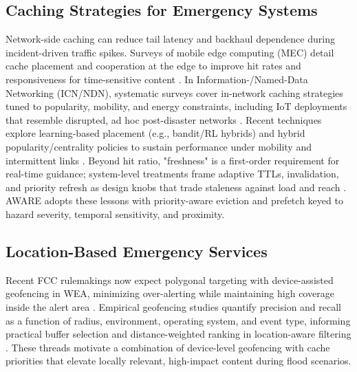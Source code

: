 \subsection{Caching Strategies for Emergency Systems}
Network-side caching can reduce tail latency and backhaul dependence during incident-driven traffic spikes. Surveys of mobile edge computing (MEC) detail cache placement and cooperation at the edge to improve hit rates and responsiveness for time-sensitive content \cite{mec-caching-survey-2023}. In Information-/Named-Data Networking (ICN/NDN), systematic surveys cover in-network caching strategies tuned to popularity, mobility, and energy constraints, including IoT deployments that resemble disrupted, ad hoc post-disaster networks \cite{icn-iot-caching-survey-2023}. Recent techniques explore learning-based placement (e.g., bandit/RL hybrids) and hybrid popularity/centrality policies to sustain performance under mobility and intermittent links \cite{cache-mab-2023,electronics-2024-koide-icanet}. Beyond hit ratio, "freshness" is a first-order requirement for real-time guidance; system-level treatments frame adaptive TTLs, invalidation, and priority refresh as design knobs that trade staleness against load and reach \cite{hotnets-2024-freshness}. AWARE adopts these lessons with priority-aware eviction and prefetch keyed to hazard severity, temporal sensitivity, and proximity.

\subsection{Location-Based Emergency Services}
Recent FCC rulemakings now expect polygonal targeting with device-assisted geofencing in WEA, minimizing over-alerting while maintaining high coverage inside the alert area \cite{fcc-2018-geo,fcc-wea-2023-doc}. Empirical geofencing studies quantify precision and recall as a function of radius, environment, operating system, and event type, informing practical buffer selection and distance-weighted ranking in location-aware filtering \cite{shevchenko-2023-geofencing}. These threads motivate a combination of device-level geofencing with cache priorities that elevate locally relevant, high-impact content during flood scenarios.

